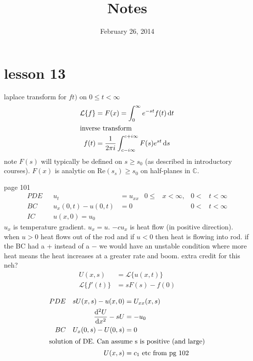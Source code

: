 \documentclass{article}
\begin{document}
\title{Notes}
\date{February 26, 2014}
\maketitle

\section*{lesson 13}
laplace transform for $ft)$ on $0\le t<\infty$
\begin{align*}
  \mathcal{L}\{f\}&=F(x)=\int_0^{\infty}{e^{-st}f(t)\,\mathrm{d}t}\\
  \intertext{inverse transform}
  f(t)&=\frac{1}{2\pi i}\int_{c-i\infty}^{c+i\infty}{F(s)e^{st}\,\mathrm{d}s}
\end{align*}
note $F(s)$ will typically be defined on $s\ge s_0$ (as described in introductory courses). $F(x)$ is analytic on $\text{Re}(s_s)\ge s_0$ on half-planes in $\mathbb{C}$.

page 101
\begin{align*}
  PDE&&u_t&=u_{xx}&0\le&x<\infty,&0<&t<\infty\\
  BC&&u_x(0,t)-u(0,t)&=0&&&0<&t<\infty\\
  IC&&u(x,0)=u_0
\end{align*}
$u_x$ is temperature gradient. $u_x=u$. $-cu_x$ is heat flow (in positive direction). when $u>0$ heat flows out of the rod and if $u<0$ then heat is flowing into rod. if the BC had a + instead of a $-$ we would have an unstable condition where more heat means the heat increases at a greater rate and boom. extra credit for this neh?
\begin{align*}
  U(x,s)&=\mathcal{L}\{u(x,t)\}\\
  \mathcal{L}\{f'(t)\}&=sF(s)-f(0)\\
\end{align*}
\begin{align*}
  PDE&&sU(x,s)-u(x,0)&=U_{xx}(x,s)\\
  &&\frac{\mathrm{d}^2U}{\mathrm{d}x^2}-sU&=-u_0\\
  BC&&U_x(0,s)-U(0,s)&=0\\
  \intertext{solution of DE. Can assume s is positive (and large)}
  &&U(x,s)&=c_1\text{ etc from pg 102}
\end{align*}
\end{document}
